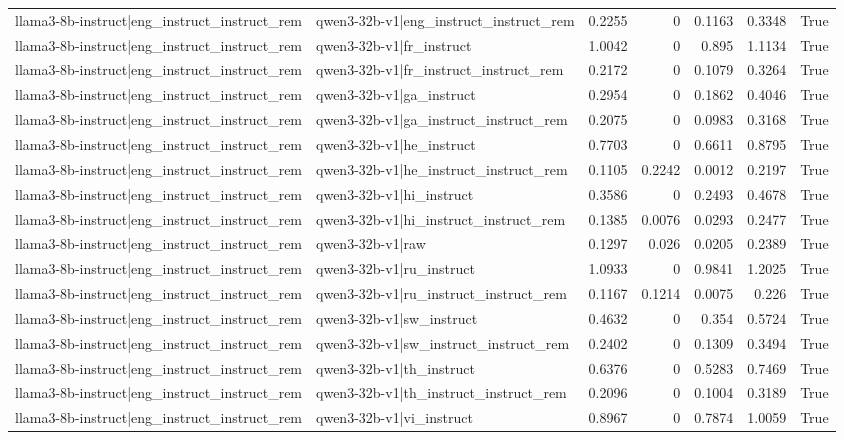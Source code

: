 \begin{table}
\begin{tabular}{l l r r r r l}
llama3-8b-instruct|eng_instruct_instruct_rem & qwen3-32b-v1|eng_instruct_instruct_rem & 0.2255 & 0 & 0.1163 & 0.3348 & True \\
llama3-8b-instruct|eng_instruct_instruct_rem & qwen3-32b-v1|fr_instruct & 1.0042 & 0 & 0.895 & 1.1134 & True \\
llama3-8b-instruct|eng_instruct_instruct_rem & qwen3-32b-v1|fr_instruct_instruct_rem & 0.2172 & 0 & 0.1079 & 0.3264 & True \\
llama3-8b-instruct|eng_instruct_instruct_rem & qwen3-32b-v1|ga_instruct & 0.2954 & 0 & 0.1862 & 0.4046 & True \\
llama3-8b-instruct|eng_instruct_instruct_rem & qwen3-32b-v1|ga_instruct_instruct_rem & 0.2075 & 0 & 0.0983 & 0.3168 & True \\
llama3-8b-instruct|eng_instruct_instruct_rem & qwen3-32b-v1|he_instruct & 0.7703 & 0 & 0.6611 & 0.8795 & True \\
llama3-8b-instruct|eng_instruct_instruct_rem & qwen3-32b-v1|he_instruct_instruct_rem & 0.1105 & 0.2242 & 0.0012 & 0.2197 & True \\
llama3-8b-instruct|eng_instruct_instruct_rem & qwen3-32b-v1|hi_instruct & 0.3586 & 0 & 0.2493 & 0.4678 & True \\
llama3-8b-instruct|eng_instruct_instruct_rem & qwen3-32b-v1|hi_instruct_instruct_rem & 0.1385 & 0.0076 & 0.0293 & 0.2477 & True \\
llama3-8b-instruct|eng_instruct_instruct_rem & qwen3-32b-v1|raw & 0.1297 & 0.026 & 0.0205 & 0.2389 & True \\
llama3-8b-instruct|eng_instruct_instruct_rem & qwen3-32b-v1|ru_instruct & 1.0933 & 0 & 0.9841 & 1.2025 & True \\
llama3-8b-instruct|eng_instruct_instruct_rem & qwen3-32b-v1|ru_instruct_instruct_rem & 0.1167 & 0.1214 & 0.0075 & 0.226 & True \\
llama3-8b-instruct|eng_instruct_instruct_rem & qwen3-32b-v1|sw_instruct & 0.4632 & 0 & 0.354 & 0.5724 & True \\
llama3-8b-instruct|eng_instruct_instruct_rem & qwen3-32b-v1|sw_instruct_instruct_rem & 0.2402 & 0 & 0.1309 & 0.3494 & True \\
llama3-8b-instruct|eng_instruct_instruct_rem & qwen3-32b-v1|th_instruct & 0.6376 & 0 & 0.5283 & 0.7469 & True \\
llama3-8b-instruct|eng_instruct_instruct_rem & qwen3-32b-v1|th_instruct_instruct_rem & 0.2096 & 0 & 0.1004 & 0.3189 & True \\
llama3-8b-instruct|eng_instruct_instruct_rem & qwen3-32b-v1|vi_instruct & 0.8967 & 0 & 0.7874 & 1.0059 & True \\

\end{tabular}
\end{table}
